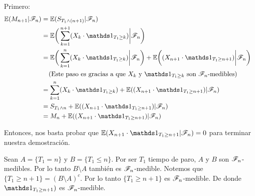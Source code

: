 \begin{itemize}
			Primero:
			\begin{align}
				\E(M_{n+1} | \F_{n})    &=  \E( S_{T_1 \wedge (n+1)} | \F_{n})                                                          \\
                                        &=  \E\bigg( \sum_{k=1}^{n+1} (X_k \cdot \indic_{T_1 \geq k})\bigg| \F_{n}\bigg)                \\	 			
                                        &=  \E\bigg( \sum_{k=1}^{n} (X_k \cdot \indic_{T_1 \geq k}) \bigg| \F_{n}\bigg) +
                                            \E\bigg((X_{n+1} \cdot \indic_{T_1 \geq n+1}) \bigg| \F_{n}\bigg)                           \\
                                        &\;\;\;\;\mbox{(Este paso es gracias a que $X_k$ y $\indic_{T_1 \geq k}$ son $\F_n$-medibles)}  \\
                                        &=  \sum_{k=1}^{n} (X_k \cdot \indic_{T_1 \geq k}) + 
                                            \E((X_{n+1} \cdot \indic_{T_1 \geq n+1}) | \F_{n})                                          \\
                                        &=  S_{T_1 \wedge n} + \E((X_{n+1} \cdot \indic_{T_1 \geq n+1}) | \F_{n})                       \\
                                        &=  M_n + \E((X_{n+1} \cdot \indic_{T_1 \geq n+1}) | \F_{n})
			\end{align}
			
			Entonces, nos basta probar que $\E(X_{n+1} \cdot \indic_{T_1 \geq n+1} |
			 \F_{n}) = 0$ para terminar nuestra demostración.\par\null
			 
			Sean $A = \{T_1 = n\}$ y $B = \{ T_1 \leq n\}$. Por ser $T_1$ tiempo de paro,
			$A$ y $B$ son $\mathscr{F}_n$-medibles. Por lo tanto $B \setminus A$ también es $\mathscr{F}_n$-medible. 
			Notemos que $\{T_1 \geq n+1\} = (B \setminus A)^c$. Por lo tanto $\{T_1 \geq n+1\}$ es
			$\mathscr{F}_n$-medible. De donde  $\indic_{T_1 \geq n+1})$ es $\mathscr{F}_n$-medible.\par\null
			

\end{itemize}
